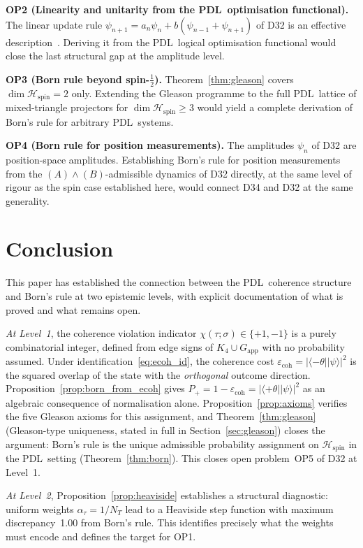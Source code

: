 \documentclass[11pt,a4paper]{article}
\theoremstyle{definition}
\newcommand{\PDL}{\textnormal{PDL}}
\newcommand{\Kfour}{K_4}
\newcommand{\Hspin}{\mathcal{H}_{\mathrm{spin}}}
\newcommand{\ecoh}{\varepsilon_{\mathrm{coh}}}
\newcommand{\pket}[1]{|#1\rangle}
\newcommand{\pbra}[1]{\langle#1|}
\begin{document}
\textbf{OP2 (Linearity and unitarity from the \PDL\ optimisation functional).} The linear update rule $\psi_{n+1} = a_n\psi_n + b(\psi_{n-1}+\psi_{n+1})$ of D32 is an effective description~\cite{PDL_D32_2026}. Deriving it from the \PDL\ logical optimisation functional would close the last structural gap at the amplitude level.

\textbf{OP3 (Born rule beyond spin-$\tfrac{1}{2}$).} Theorem~\ref{thm:gleason} covers $\dim\Hspin = 2$ only. Extending the Gleason programme to the full \PDL\ lattice of mixed-triangle projectors for $\dim\Hspin \geq 3$ would yield a complete derivation of Born's rule for arbitrary \PDL\ systems.

\textbf{OP4 (Born rule for position measurements).} The amplitudes $\psi_n$ of D32 are position-space amplitudes. Establishing Born's rule for position measurements from the $(A)\wedge(B)$-admissible dynamics of D32 directly, at the same level of rigour as the spin case established here, would connect D34 and D32 at the same generality.

\section*{Conclusion}

This paper has established the connection between the \PDL\ coherence structure and Born's rule at two epistemic levels, with explicit documentation of what is proved and what remains open.

\emph{At Level~1}, the coherence violation indicator $\chi(\tau;\sigma) \in \{+1,-1\}$ is a purely combinatorial integer, defined from edge signs of $\Kfour \cup G_{\mathrm{app}}$ with no probability assumed. Under identification~\eqref{eq:ecoh_id}, the coherence cost $\ecoh = |\pbra{-\theta}\pket{\psi}|^2$ is the squared overlap of the state with the \emph{orthogonal} outcome direction. Proposition~\ref{prop:born_from_ecoh} gives $P_+ = 1 - \ecoh = |\pbra{+\theta}\pket{\psi}|^2$ as an algebraic consequence of normalisation alone. Proposition~\ref{prop:axioms} verifies the five Gleason axioms for this assignment, and Theorem~\ref{thm:gleason} (Gleason-type uniqueness, stated in full in Section~\ref{sec:gleason}) closes the argument: Born's rule is the unique admissible probability assignment on $\Hspin$ in the \PDL\ setting (Theorem~\ref{thm:born}). This closes open problem~OP5 of D32 at Level~1.

\emph{At Level~2}, Proposition~\ref{prop:heaviside} establishes a structural diagnostic: uniform weights $\alpha_\tau = 1/N_T$ lead to a Heaviside step function with maximum discrepancy~1.00 from Born's rule. This identifies precisely what the weights must encode and defines the target for OP1.
\end{document}
